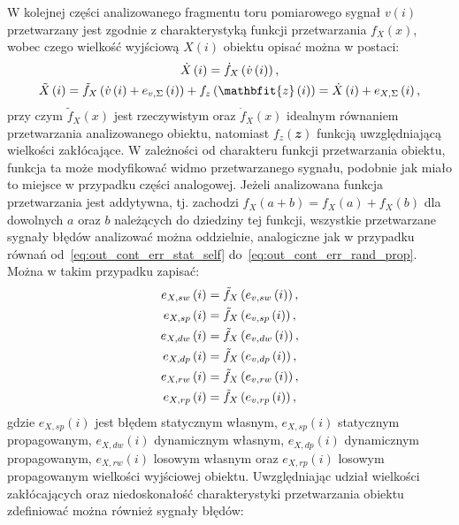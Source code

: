 W kolejnej części analizowanego fragmentu toru pomiarowego sygnał $v(i)$ przetwarzany jest zgodnie z charakterystyką funkcji przetwarzania $f_{X}(x)$, wobec czego wielkość wyjściową $X(i)$ obiektu opisać można w postaci:
\begin{gather}
\dot{X} \emb{i} = \dot{f}_{X} \left( \dot{v} \emb{i} \right) \label{eq:out_disc_ideal_all}, \\
\tilde{X} \emb{i} = \tilde{f}_{X} \left( \dot{v} \emb{i} + e_{v,\Sigma} \emb{i} \right) + f_{z} \emb{\mathbfit{z} \emb{i}} = \dot{X} \emb{i} + e_{X,\Sigma} \emb{i} \label{eq:out_disc_real_all},
\end{gather}
przy czym $\tilde{f}_{X}(x)$ jest rzeczywistym oraz $\dot{f}_{X}(x)$ idealnym równaniem przetwarzania analizowanego obiektu, natomiast $f_{z}(\mathbfit{z})$ funkcją uwzględniającą wielkości zakłócające. W zależności od charakteru funkcji przetwarzania obiektu, funkcja ta może modyfikować widmo przetwarzanego sygnału, podobnie jak miało to miejsce w przypadku części analogowej. Jeżeli analizowana funkcja przetwarzania jest addytywna, tj. zachodzi $f_{X}(a + b) = f_{X}(a) + f_{X}(b)$ dla dowolnych $a$ oraz $b$ należących do dziedziny tej funkcji, wszystkie przetwarzane sygnały błędów analizować można oddzielnie, analogiczne jak w przypadku równań od~\eqref{eq:out_cont_err_stat_self} do~\eqref{eq:out_cont_err_rand_prop}. Można w takim przypadku zapisać:
\begin{gather}
e_{X,sw} \left(i\right) = \tilde{f}_{X} \left( e_{v,sw} \left(i\right) \right) \label{eq:out_disc_err_stat_self}, \\
e_{X,sp} \left(i\right) = \tilde{f}_{X} \left( e_{v,sp} \left(i\right) \right) \label{eq:out_disc_err_stat_prop}, \\
e_{X,dw} \left(i\right) = \tilde{f}_{X} \left( e_{v,dw} \left(i\right) \right) \label{eq:out_disc_err_dyn_self}, \\
e_{X,dp} \left(i\right) = \tilde{f}_{X} \left( e_{v,dp} \left(i\right) \right) \label{eq:out_disc_err_dyn_prop}, \\
e_{X,rw} \left(i\right) = \tilde{f}_{X} \left( e_{v,rw} \left(i\right) \right) \label{eq:out_disc_err_rand_self}, \\
e_{X,rp} \left(i\right) = \tilde{f}_{X} \left( e_{v,rp} \left(i\right) \right) \label{eq:out_disc_err_rand_prop},
\end{gather}
gdzie $e_{X,sp}(i)$ jest błędem statycznym własnym, $e_{X,sp}(i)$ statycznym propagowanym, $e_{X,dw}(i)$ dynamicznym własnym, $e_{X,dp}(i)$ dynamicznym propagowanym, $e_{X,rw}(i)$ losowym własnym oraz $e_{X,rp}(i)$ losowym propagowanym wielkości wyjściowej obiektu. Uwzględniając udział wielkości zakłócających oraz niedoskonałość charakterystyki przetwarzania obiektu zdefiniować można również sygnały błędów:

